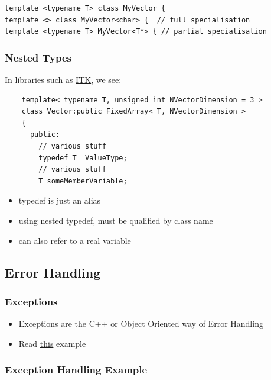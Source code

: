 \begin{verbatim}
template <typename T> class MyVector {
template <> class MyVector<char> {  // full specialisation
template <typename T> MyVector<T*> { // partial specialisation
\end{verbatim}

\subsubsection{Nested Types}\label{nested-types}

In libraries such as \href{http://www.itk.org}{ITK}, we see:

\begin{verbatim}
    template< typename T, unsigned int NVectorDimension = 3 >
    class Vector:public FixedArray< T, NVectorDimension >
    {
      public:
        // various stuff
        typedef T  ValueType;
        // various stuff
        T someMemberVariable;
\end{verbatim}

\begin{itemize}
\itemsep1pt\parskip0pt
\item
  typedef is just an alias
\item
  using nested typedef, must be qualified by class name
\item
  can also refer to a real variable
\end{itemize}

\subsection{Error Handling}\label{error-handling}

\subsubsection{Exceptions}\label{exceptions}

\begin{itemize}
\itemsep1pt\parskip0pt
\item
  Exceptions are the C++ or Object Oriented way of Error Handling
\item
  Read
  \href{https://msdn.microsoft.com/en-us/library/hh279678.aspx}{this}
  example
\end{itemize}

\subsubsection{Exception Handling
Example}\label{exception-handling-example}

